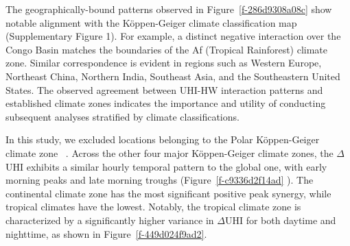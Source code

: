 \documentclass[]{nature}
\makeatletter
\renewenvironment{figure}
               {\@float{figure}}
               {\end@float}
\renewenvironment{figure*}
               {\@dblfloat{figure}}
               {\end@dblfloat}
\def\fixFloatSize#1{}%
\def\fixFloatSize#1{}
\makeatother
\begin{document}
\bgroup
\fixFloatSize{images/9866ade5-4042-4d5f-9574-e00715ca7d29-ufigure_2_ab_all_uhi_day_night_comparison_figure3_style.png}
\begin{figure*}[!htbp]
\centering \makeatletter{}
\makeatother 
\caption{{\textbf{Nighttime \ensuremath{\Delta }UHI is stronger than that of Daytime.} Geographical distributions of \ensuremath{\Delta }UHI during daytime (a) and nighttime (b). }}
\label{f-286d9308a08c}
\end{figure*}
\egroup

\bgroup
\fixFloatSize{images/306ab391-c84b-42e2-af81-6ce3f4ac52e0-ukoppengeiger.png}
\begin{figure*}[!htbp]
\centering \makeatletter{}
\makeatother 
\caption{{K{\"{o}}ppen{\textendash}Geiger climate map 1991{\textendash}2020\unskip~\protect\cite{2755510:33598889}}}
\label{f-3967a5eb5d38}
\end{figure*}
\egroup
The geographically-bound patterns observed in Figure~\ref{f-286d9308a08c}  show notable alignment with the K{\"{o}}ppen-Geiger climate classification map\unskip~\cite{2755510:33598889}  (Supplementary Figure 1). For example, a distinct negative interaction over the Congo Basin matches the boundaries of the Af (Tropical Rainforest) climate zone. Similar correspondence is evident in regions such as Western Europe, Northeast China, Northern India, Southeast Asia, and the Southeastern United States. The observed agreement between UHI-HW interaction patterns and established climate zones indicates the importance and utility of conducting subsequent analyses stratified by climate classifications.

In this study, we excluded locations belonging to the Polar K{\"{o}}ppen-Geiger climate zone\unskip~\cite{2755510:33598889} . Across the other four major K{\"{o}}ppen-Geiger climate zones, the \ensuremath{\Delta }UHI exhibits a similar hourly temporal pattern to the global one, with early morning peaks and late morning troughs (Figure~\ref{f-c9336d2f14ad} ). The continental climate zone has the most significant positive peak synergy, while tropical climates have the lowest. Notably, the tropical climate zone is characterized by a significantly higher variance in \ensuremath{\Delta }UHI for both daytime and nighttime, as shown in Figure~\ref{f-449d024f9ad2}.
\end{document}
